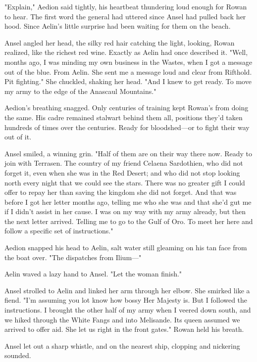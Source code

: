 "Explain," Aedion said tightly, his heartbeat thundering loud enough for Rowan to hear. The first word the general had uttered since Ansel had pulled back her hood. Since Aelin's little surprise had been waiting for them on the beach.

Ansel angled her head, the silky red hair catching the light, looking, Rowan realized, like the richest red wine. Exactly as Aelin had once described it. "Well, months ago, I was minding my own business in the Wastes, when I got a message out of the blue. From Aelin. She sent me a message loud and clear from Rifthold. Pit fighting." She chuckled, shaking her head. "And I knew to get ready. To move my army to the edge of the Anascaul Mountains."

Aedion's breathing snagged. Only centuries of training kept Rowan's from doing the same. His cadre remained stalwart behind them all, positions they'd taken hundreds of times over the centuries. Ready for bloodshed---or to fight their way out of it.

Ansel smiled, a winning grin. "Half of them are on their way there now. Ready to join with Terrasen. The country of my friend Celaena Sardothien, who did not forget it, even when she was in the Red Desert;
and who did not stop looking north every night that we could see the stars. There was no greater gift I could offer to repay her than saving the kingdom she did not forget. And that was before I got her letter months ago, telling me who she was and that she'd gut me if I didn't assist in her cause. I was on my way with my army already, but 
then the next letter arrived. Telling me to go to the Gulf of Oro. To meet her here and follow a specific set of instructions."

Aedion snapped his head to Aelin, salt water still gleaming on his tan face from the boat over. "The dispatches from Ilium---"

Aelin waved a lazy hand to Ansel. "Let the woman finish."

Ansel strolled to Aelin and linked her arm through her elbow. She smirked like a fiend. "I'm assuming you lot know how bossy Her Majesty is. But I followed the instructions. I brought the other half of my army when I veered down south, and we hiked through the White Fangs and into Melisande. Its queen assumed we arrived to offer aid. She let us right in the front gates." Rowan held his breath.

Ansel let out a sharp whistle, and on the nearest ship, clopping and nickering sounded.

